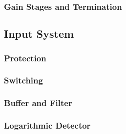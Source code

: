 \subsubsection{Gain Stages and Termination}

\subsection{Input System}

\subsubsection{Protection}
\subsubsection{Switching}
\subsubsection{Buffer and Filter}
\subsubsection{Logarithmic Detector}
